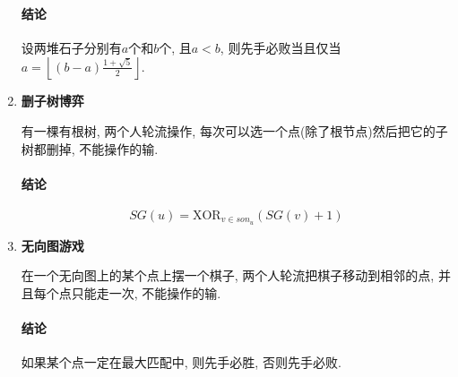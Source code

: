 \begin{enumerate}
\paragraph{结论}设两堆石子分别有$a$个和$b$个, 且$a<b$, 则先手必败当且仅当$a = \left\lfloor (b-a)\frac {1 + \sqrt 5} 2 \right\rfloor$.

\item \textbf{删子树博弈}

有一棵有根树, 两个人轮流操作, 每次可以选一个点(除了根节点)然后把它的子树都删掉, 不能操作的输.

\paragraph{结论}

$$ SG(u) = \text{XOR} _{v \in son_u} \left( SG(v) + 1 \right) $$

\item \textbf{无向图游戏}

在一个无向图上的某个点上摆一个棋子, 两个人轮流把棋子移动到相邻的点, 并且每个点只能走一次, 不能操作的输.

\paragraph{结论}如果某个点一定在最大匹配中, 则先手必胜, 否则先手必败.

\end{enumerate}